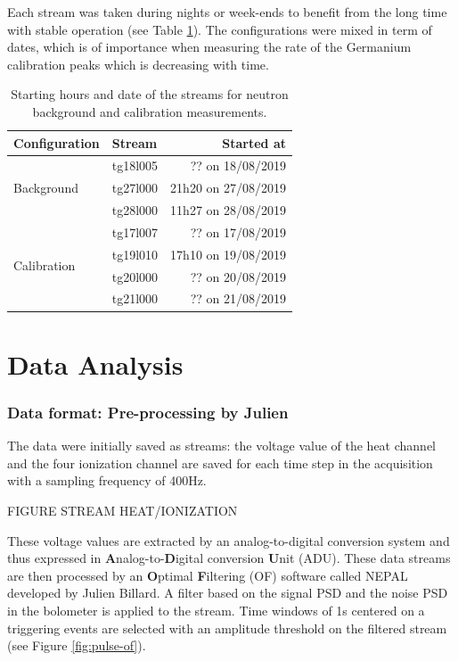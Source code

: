 Each stream was taken during nights or week-ends to benefit from the long time with stable operation (see Table \ref{tab:neutron-streams}). The configurations were mixed in term of dates, which is of importance when measuring the rate of the Germanium calibration peaks which is decreasing with time.

\begin{table}[]
\centering
\begin{tabular}{l|l|r}
Configuration                & Stream   & Started at          \\ \hline
\multirow{3}{*}{Background}  & tg18l005 & ?? on 18/08/2019    \\
                             & tg27l000 & 21h20 on 27/08/2019 \\
                             & tg28l000 & 11h27 on 28/08/2019 \\ \hline
\multirow{4}{*}{Calibration} & tg17l007 & ?? on 17/08/2019    \\
                             & tg19l010 & 17h10 on 19/08/2019 \\
                             & tg20l000 & ?? on 20/08/2019    \\
                             & tg21l000 & ?? on 21/08/2019   
\end{tabular}
\caption{Starting hours and date of the streams for neutron background and calibration measurements.}
\label{tab:neutron-streams}
\end{table}


\section{Data Analysis}


\subsubsection{Data format: Pre-processing by Julien}

The data were initially saved as streams: the voltage value of the heat channel and the four ionization channel are saved for each time step in the acquisition with a sampling frequency of 400Hz. 

{\color{red} FIGURE STREAM HEAT/IONIZATION}

These voltage values are extracted by an analog-to-digital conversion system and thus expressed in \textbf{A}nalog-to-\textbf{D}igital conversion \textbf{U}nit (ADU).
These data streams are then processed by an \textbf{O}ptimal \textbf{F}iltering (OF) software called NEPAL developed by Julien Billard. A filter based on the signal PSD and the noise PSD in the bolometer is applied to the stream. Time windows of 1s centered on a triggering events are selected with an amplitude threshold on the filtered stream (see Figure \ref{fig:pulse-of}).

